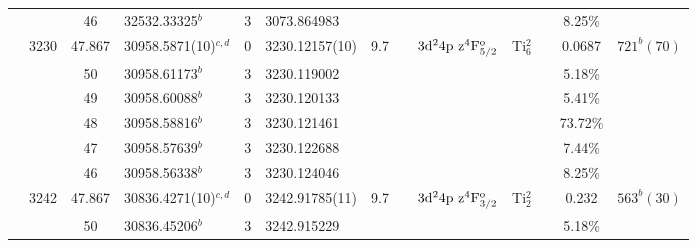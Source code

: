 \begin{table*}
\begin{center}
{\begin{tabular}{:l;l;c;l;c;l;c;l;l;c;c;c;c}
\rowstyle{\itshape}               &        & 46        & 32532.33325$^{b}$                & 3 &   3073.864983      &      & $                                        $ & $                                        $ &             &              & 8.25\%    & $     ^{}     $\\
                                  & 3230   & 47.867    & 30958.5871(10)$^{c,d}$           & 0 &    3230.12157(10)  &  9.7 & $                                        $ & $3\rm{d}^24\rm{p~z}^4\rm{F}_{5/2}^{\rm o}$ & Ti$^2_{6}$  &              & 0.0687    & $  721^{b}(70) $\\
\rowstyle{\itshape}               &        & 50        & 30958.61173$^{b}$                & 3 &   3230.119002      &      & $                                        $ & $                                        $ &             &              & 5.18\%    & $     ^{}     $\\
\rowstyle{\itshape}               &        & 49        & 30958.60088$^{b}$                & 3 &   3230.120133      &      & $                                        $ & $                                        $ &             &              & 5.41\%    & $     ^{}     $\\
\rowstyle{\itshape}               &        & 48        & 30958.58816$^{b}$                & 3 &   3230.121461      &      & $                                        $ & $                                        $ &             &              & 73.72\%   & $     ^{}     $\\
\rowstyle{\itshape}               &        & 47        & 30958.57639$^{b}$                & 3 &   3230.122688      &      & $                                        $ & $                                        $ &             &              & 7.44\%    & $     ^{}     $\\
\rowstyle{\itshape}               &        & 46        & 30958.56338$^{b}$                & 3 &   3230.124046      &      & $                                        $ & $                                        $ &             &              & 8.25\%    & $     ^{}     $\\
                                  & 3242   & 47.867    & 30836.4271(10)$^{c,d}$           & 0 &    3242.91785(11)  &  9.7 & $                                        $ & $3\rm{d}^24\rm{p~z}^4\rm{F}_{3/2}^{\rm o}$ & Ti$^2_{2}$  &              & 0.232     & $  563^{b}(30) $\\
\rowstyle{\itshape}               &        & 50        & 30836.45206$^{b}$                & 3 &   3242.915229      &      & $                                        $ & $                                        $ &             &              & 5.18\%    & $     ^{}     $\\

\end{tabular}}
\end{center}
\end{table*}
